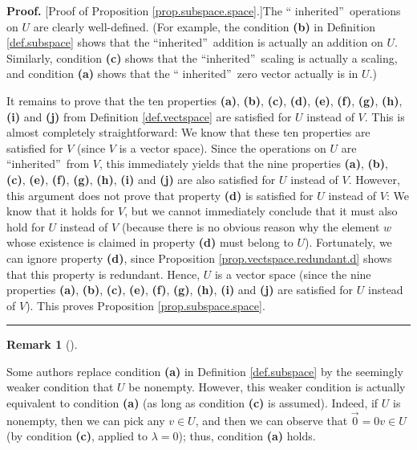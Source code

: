 \documentclass[numbers=enddot,12pt,final,onecolumn,notitlepage]{scrartcl}%
\theoremstyle{definition}
\newtheorem{remk}[theo]{Remark}
\newenvironment{remark}[1][]
{\begin{remk}[#1]\begin{leftbar}}
{\end{leftbar}\end{remk}}
\newenvironment{proof}[1][Proof]{\noindent\textbf{#1.} }{\ \rule{0.5em}{0.5em}}
\begin{document}
\begin{proof}
[Proof of Proposition \ref{prop.subspace.space}.]The \textquotedblleft
inherited\textquotedblright\ operations on $U$ are clearly well-defined. (For
example, the condition \textbf{(b)} in Definition \ref{def.subspace} shows
that the \textquotedblleft inherited\textquotedblright\ addition is actually
an addition on $U$. Similarly, condition \textbf{(c)} shows that the
\textquotedblleft inherited\textquotedblright\ scaling is actually a scaling,
and condition \textbf{(a)} shows that the \textquotedblleft
inherited\textquotedblright\ zero vector actually is in $U$.)

It remains to prove that the ten properties \textbf{(a)}, \textbf{(b)},
\textbf{(c)}, \textbf{(d)}, \textbf{(e)}, \textbf{(f)}, \textbf{(g)},
\textbf{(h)}, \textbf{(i)} and \textbf{(j)} from Definition
\ref{def.vectspace} are satisfied for $U$ instead of $V$. This is almost
completely straightforward: We know that these ten properties are satisfied
for $V$ (since $V$ is a vector space). Since the operations on $U$ are
\textquotedblleft inherited\textquotedblright\ from $V$, this immediately
yields that the nine properties \textbf{(a)}, \textbf{(b)}, \textbf{(c)},
\textbf{(e)}, \textbf{(f)}, \textbf{(g)}, \textbf{(h)}, \textbf{(i)} and
\textbf{(j)} are also satisfied for $U$ instead of $V$. However, this argument
does not prove that property \textbf{(d)} is satisfied for $U$ instead of $V$:
We know that it holds for $V$, but we cannot immediately conclude that it must
also hold for $U$ instead of $V$ (because there is no obvious reason why the
element $w$ whose existence is claimed in property \textbf{(d)} must belong to
$U$). Fortunately, we can ignore property \textbf{(d)}, since Proposition
\ref{prop.vectspace.redundant.d} shows that this property is redundant. Hence,
$U$ is a vector space (since the nine properties \textbf{(a)}, \textbf{(b)},
\textbf{(c)}, \textbf{(e)}, \textbf{(f)}, \textbf{(g)}, \textbf{(h)},
\textbf{(i)} and \textbf{(j)} are satisfied for $U$ instead of $V$). This
proves Proposition \ref{prop.subspace.space}.
\end{proof}

\begin{remark}
Some authors replace condition \textbf{(a)} in Definition \ref{def.subspace}
by the seemingly weaker condition that $U$ be nonempty. However, this weaker
condition is actually equivalent to condition \textbf{(a)} (as long as
condition \textbf{(c)} is assumed). Indeed, if $U$ is nonempty, then we can
pick any $v\in U$, and then we can observe that $\overrightarrow{0}=0v\in U$
(by condition \textbf{(c)}, applied to $\lambda=0$); thus, condition
\textbf{(a)} holds.
\end{remark}
\end{document}

